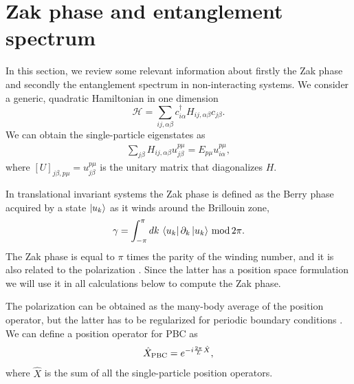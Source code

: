 \documentclass[twocolumn,amsmath,longbibliography,amssymb,superscriptaddress]{revtex4-1}
\begin{document}
\section{Zak phase and entanglement spectrum}
In this section, we review some relevant information about firstly the Zak phase and secondly the entanglement spectrum in non-interacting systems. 
We consider a generic, quadratic Hamiltonian in one dimension
\begin{equation}\label{eq:quadr_Ham}
\mathcal{H} = \sum_{ij,\alpha\beta} c_{i\alpha}^\dagger H_{ij,\alpha \beta}c_{j\beta}.
\end{equation}
We can obtain the single-particle eigenstates as
\begin{align}
\sum_{j\beta}H_{ij,\alpha\beta} u^{p\mu}_{j\beta} = E_{p\mu} u_{i\alpha}^{p\mu},
\end{align}
where $[U]_{j\beta,p\mu} = u^{p\mu}_{j\beta}$ is the unitary matrix that diagonalizes $H$. 

In translational invariant systems the Zak phase is defined as the Berry phase acquired by a state $\ket{u_k}$ as it winds around the Brillouin zone,
\begin{equation}
\gamma = \int_{-\pi}^\pi dk \, \bra{u_k}\partial_k \ket{u_k} \, {\rm mod}\, 2\pi.
\end{equation}
The Zak phase is equal to $\pi$ times the parity of the winding number, and it is also related to the polarization \cite{Resta1997}. Since the latter has a position space formulation we will use  it in all calculations below to compute the Zak phase. 

The polarization can be obtained as the many-body average of the position operator, but the latter has to be regularized for periodic boundary conditions \cite{Resta1997}. 
We can define a position operator for PBC as
\begin{equation}
\hat{X}_{\rm PBC} = e^{-i\frac{2\pi}{L}\hat{X}},
\end{equation}
where $\hat{X}$ is the sum of all the single-particle position operators. 
\end{document}
